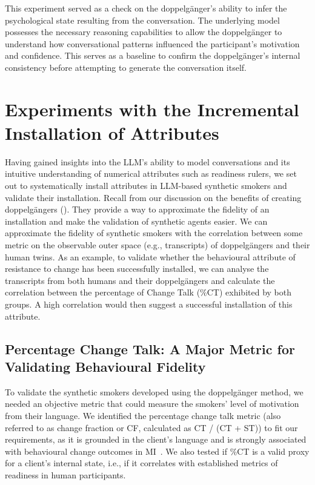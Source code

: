 This experiment served as a check on the doppelgänger's ability to infer the psychological state resulting from the conversation. The underlying model possesses the necessary reasoning capabilities to allow the doppelgänger to understand how conversational patterns influenced the participant's motivation and confidence. This serves as a baseline to confirm the doppelgänger's internal consistency before attempting to generate the conversation itself.



\section{Experiments with the Incremental Installation of Attributes}
Having gained insights into the LLM's ability to model conversations and its intuitive understanding of numerical attributes such as readiness rulers, we set out to systematically install attributes in LLM-based synthetic smokers and validate their installation. Recall from our discussion on the benefits of creating doppelgängers (). They provide a way to approximate the fidelity of an installation and make the validation of synthetic agents easier. We can approximate the fidelity of synthetic smokers with the correlation between some metric on the observable outer space (e.g., transcripts) of doppelgängers and their human twins. As an example, to validate whether the behavioural attribute of resistance to change has been successfully installed, we can analyse the transcripts from both humans and their doppelgängers and calculate the correlation between the percentage of Change Talk (\%CT) exhibited by both groups. A high correlation would then suggest a successful installation of this attribute.


\subsection*{Percentage Change Talk: A Major Metric for Validating Behavioural Fidelity}

To validate the synthetic smokers developed using the doppelgänger method, we needed an objective metric that could measure the smokers' level of motivation from their language.
We identified the percentage change talk metric (also referred to as change fraction or CF, calculated as CT / (CT + ST)) to fit our requirements, as it is grounded in the client's language and is strongly associated with behavioural change outcomes in MI~\cite{Barnett2014,Houck2018,Moyers2009,Baer2008}.
We also tested if \%CT is a valid proxy for a client's internal state, i.e., if it correlates with established metrics of readiness in human participants.

